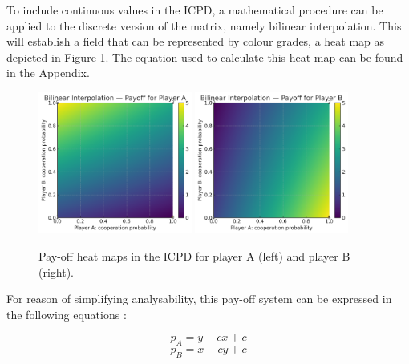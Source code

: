 \documentclass[11pt]{article}
\begin{document}
To include continuous values in the ICPD, a mathematical procedure can be applied to the discrete version of the matrix, namely bilinear interpolation.
This will establish a field that can be represented by colour grades, a heat map as depicted in Figure \ref{fig:heatmaps}.
The equation used to calculate this heat map can be found in the Appendix.

\begin{figure}[h]
	\centering
	\includegraphics[width=0.45\textwidth]{images/pd_heatmap_A}\hfill
	\includegraphics[width=0.45\textwidth]{images/pd_heatmap_B}
	\caption{Pay-off heat maps in the ICPD for player A (left) and player B (right).}
	\label{fig:heatmaps}
\end{figure}

%
%
For reason of simplifying analysability, this pay-off system can be expressed in the following equations \cite[cf.][p.~259]{LB07}:

\begin{equation}
	p_A = y - c x + c
	\label{eq:payoff_A}
\end{equation}
\begin{equation}
	p_B = x - c y + c
	\label{eq:payoff_B}
\end{equation}
\end{document}
